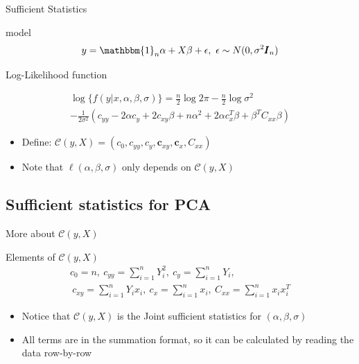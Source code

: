 \documentclass[ignorenonframetext,]{beamer}
\providecommand{\tightlist}{%
  \setlength{\itemsep}{0pt}\setlength{\parskip}{0pt}}
\begin{document}
\begin{frame}{Sufficient Statistics}

\begin{block}{model}
\[
  y = \mathbbm{1}_{n}\alpha + X\beta + \epsilon,~\epsilon \sim N(0, \sigma^2\pmb{I}_n)
\]
\end{block}

\begin{block}{Log-Likelihood function}

\begin{multline*}
  \log{\{f(y|x, \alpha, \beta, \sigma)\}} =  \frac{n}{2}\log{2\pi} - \frac{n}{2}\log{\sigma^2} \\ -\frac{1}{2\sigma^2}(c_{yy} - 2\alpha c_y + 2c_{xy}\beta + n\alpha^2 + 2\alpha c_x^T\beta +\beta^T C_{xx} \beta) 
\end{multline*}

\end{block}

\begin{itemize}
\item
  Define:
  \(\mathcal{C}(y, X) = (c_0, c_{yy}, c_y, \pmb{c}_{xy}, \pmb{c}_x, C_{xx})\)
\item
  Note that \(\ell(\alpha, \beta, \sigma)\) only depends on
  \(\mathcal{C}(y, X)\)
\end{itemize}

\end{frame}

\subsection{Sufficient statistics for
PCA}\label{sufficient-statistics-for-pca}

\begin{frame}{More about \(\mathcal{C}(y, X)\)}

\begin{block}{Elements of $\mathcal{C}(y, X)$}
  \begin{gather*}
  c_{0} = n, ~c_{yy} = \sum_{i=1}^n Y_i^2, ~c_y = \sum_{i=1}^n Y_i, \\
  ~c_{xy} =\sum_{i=1}^n Y_ix_i,~c_x = \sum_{i=1}^n x_i, ~C_{xx} = \sum_{i=1}^n x_ix_i^T
  \end{gather*}
\end{block}

\begin{itemize}
\tightlist
\item
  Notice that \(\mathcal{C}(y, X)\) is the Joint sufficient statistics
  for \((\alpha, \beta, \sigma)\)
\item
  All terms are in the summation format, so it can be calculated by
  reading the data row-by-row
\end{itemize}

\end{frame}
\end{document}
